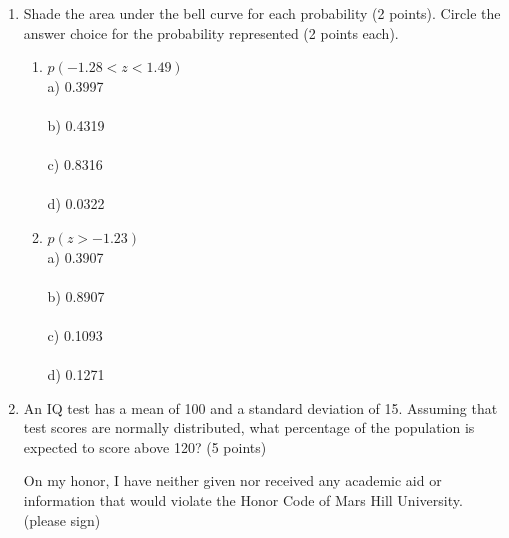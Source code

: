\documentclass[12pt]{article}
\begin{document}
\begin{enumerate}
\item Shade the area under the bell curve for each probability (2 points).  Circle the answer choice for the probability represented (2 points each).
\begin{enumerate}
\item $p(-1.28<z<1.49)$
\vspace{.7 in}
\\ a) 0.3997
\\
\\ b) 0.4319
\\
\\ c) 0.8316
\\
\\ d) 0.0322
\\
\item $p(z>-1.23)$
\vspace{.7 in}
\\ a) 0.3907
\\
\\ b) 0.8907
\\
\\ c) 0.1093
\\
\\ d) 0.1271
\\
\end{enumerate}

\item An IQ test has a mean of 100 and a standard deviation of 15.  Assuming that test scores are normally distributed, what percentage of the population is expected to score above 120? (5 points)

\vspace{3 in}


On my honor, I have neither given nor received any academic aid or information that would violate the Honor Code of Mars Hill University. \underline{\hspace{2.0 in}}(please sign)
\end{enumerate}

\end{document}
